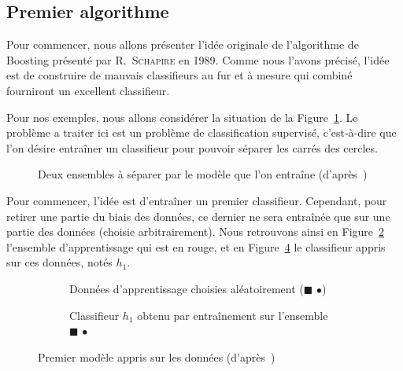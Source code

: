 \subsection{Premier algorithme}
\label{sec:boosting}
Pour commencer, nous allons présenter l'idée originale de l'algorithme de Boosting présenté par R.~\textsc{Schapire} en 1989. Comme nous l'avons précisé, l'idée est de construire de \og mauvais\fg{} classifieurs au fur et à mesure qui combiné fourniront un excellent classifieur.

Pour nos exemples, nous allons considérer la situation de la Figure~\ref{fig:boosting_situation}. Le problème a traiter ici est un problème de classification supervisé, c'est-à-dire que l'on désire entraîner un classifieur pour pouvoir séparer les carrés des cercles.


\begin{figure}[h]
	\begin{margincap}
	  	\centering
		
		\caption[fig:boosting_situation]{Deux ensembles à séparer par le modèle que l'on entraîne (d'après~\cite{bib:elghazel})}
		\label{fig:boosting_situation}
	\end{margincap}
\end{figure}

Pour commencer, l'idée est d'entraîner un premier classifieur. Cependant, pour retirer une partie du biais des données, ce dernier ne sera entraînée que sur une partie des données (choisie arbitrairement). Nous retrouvons ainsi en Figure~\ref{fig:boosting_un_app} l'ensemble d'apprentissage qui est en rouge, et en Figure~\ref{fig:boosting_un_modele} le classifieur appris sur ces données, notés $h_1$.

\begin{figure}[h]
	\begin{margincap}
	\begin{subfigure}{.45\textwidth}
		
		\caption{Données d'apprentissage choisies aléatoirement ($\blacksquare$ \large{$\bullet$})}
		\label{fig:boosting_un_app}
	\end{subfigure}\hfill
	\begin{subfigure}{.45\textwidth}
		
		\caption{Classifieur $h_1$ obtenu par entraînement sur l'ensemble $\blacksquare$ \large{$\bullet$}}
		\label{fig:boosting_un_modele}
	\end{subfigure}\hfill
	\caption{Premier modèle appris sur les données (d'après~\cite{bib:elghazel})}
	\end{margincap}
\end{figure}

